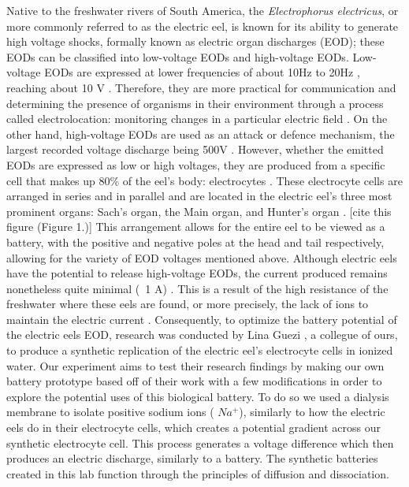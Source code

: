 \documentclass[letterpaper]{article}
\begin{document}
Native to the freshwater rivers of South America, the \textit{Electrophorus electricus}, or more 
commonly referred to as the electric eel, is known for its ability to generate high voltage shocks,
formally known as electric organ discharges (EOD); these EODs can be classified into low-voltage 
EODs and high-voltage EODs. Low-voltage EODs are expressed at lower frequencies of about 10Hz to
20Hz \parencite{cataniaAstonishingBehaviorElectric2019}, reaching about 10 V \parencite{ElectricCircuits6ElectricEels2015}. 
Therefore, they are more practical for communication and determining the presence of organisms 
in their environment through a process called electrolocation: monitoring 
changes in a particular electric field \parencite{bennettComparativePhysiologyElectric1970}. 
On the other hand, high-voltage EODs are used as an attack or defence mechanism,
the largest recorded voltage discharge being 500V \parencite{ElectricCircuits6ElectricEels2015}.
However, whether the emitted EODs are expressed as low or high 
voltages, they are produced from a specific cell that makes up 80\% of the eel’s body: electrocytes
\parencite{carlsonAnimalBehaviorElectric2015}. These electrocyte cells are arranged in series and 
in parallel and are located in the electric eel’s three most prominent organs: Sach’s organ, the 
Main organ, and Hunter’s organ \parencite{ElectricCircuits6ElectricEels2015}. [cite this figure (Figure 1.)] This 
arrangement allows for the entire eel to be viewed as a battery, with the positive and negative 
poles at the head and tail respectively, allowing for the variety of EOD voltages mentioned above. 
Although electric eels have the potential to release high-voltage EODs, the current produced remains
nonetheless quite minimal (~1 A) \parencite{ElectricCircuits6ElectricEels2015}. This is a result 
of the high resistance of the freshwater where these eels are found, or more precisely, the lack of 
ions to maintain the electric current \parencite{boisseletBiomimeticPotentialElectric2017}. 
Consequently, to optimize the battery potential of the electric eels EOD, research was conducted 
by Lina Guezi \parencite{gueziTheoreticalExaminationConception2023}, a collegue of ours, to produce 
a synthetic replication of the electric eel’s electrocyte 
cells in ionized water. Our experiment aims to test their research findings by making our own battery prototype based off of their work with a few modifications in order to explore 
the potential uses of this biological battery. To do so we used a dialysis membrane to isolate positive sodium ions ( $Na^+$), similarly to how the electric eels do in their
electrocyte cells, which creates a potential gradient across our synthetic electrocyte cell.
This process generates a voltage difference which then produces an electric discharge, 
similarly to a battery. The synthetic batteries created in this lab function through the
principles of diffusion and dissociation. 
\end{document}
